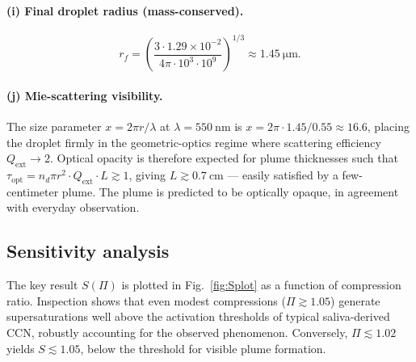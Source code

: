 \documentclass[11pt,a4paper]{article}
\theoremstyle{definition}
\theoremstyle{plain}
\begin{document}
\paragraph{(i) Final droplet radius (mass-conserved).}
\[
r_f = \left(\frac{3 \cdot 1.29 \times 10^{-2}}{4\pi \cdot 10^3 \cdot 10^9}\right)^{1/3} \approx \SI{1.45}{\micro\meter}.
\]

\paragraph{(j) Mie-scattering visibility.}
The size parameter $x = 2\pi r/\lambda$ at $\lambda = \SI{550}{\nano\meter}$ is $x = 2\pi \cdot 1.45/0.55 \approx 16.6$, placing the droplet firmly in the geometric-optics regime where scattering efficiency $Q_{\text{ext}} \to 2$. Optical opacity is therefore expected for plume thicknesses such that $\tau_{\text{opt}} = n_d \pi r^2 \cdot Q_{\text{ext}} \cdot L \gtrsim 1$, giving $L \gtrsim \SI{0.7}{\centi\meter}$ — easily satisfied by a few-centimeter plume. The plume is predicted to be optically opaque, in agreement with everyday observation.

\subsection{Sensitivity analysis}

The key result $S(\Pi)$ is plotted in Fig.~\ref{fig:Splot} as a function of compression ratio. Inspection shows that even modest compressions ($\Pi \gtrsim 1.05$) generate supersaturations well above the activation thresholds of typical saliva-derived CCN, robustly accounting for the observed phenomenon. Conversely, $\Pi \lesssim 1.02$ yields $S \lesssim 1.05$, below the threshold for visible plume formation.
\end{document}
